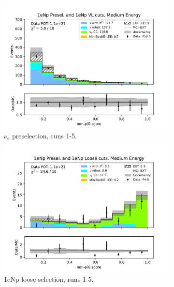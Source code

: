 \begin{figure}[H]
\begin{subfigure}{0.33\linewidth}
        \includegraphics[width=\linewidth]{technote/Sidebands/Figures/NearSideband/near_sideband_nonpi0_score_run1234b4c4d5_NP_NP_MEDIUM_ENERGY.pdf}
        \caption{$\nu_e$ preselection, runs 1-5.}
    \end{subfigure}%
    \begin{subfigure}{0.33\linewidth}
        \includegraphics[width=\linewidth]{technote/Sidebands/Figures/NearSideband/near_sideband_nonpi0_score_run1234b4c4d5_NP_NPL_MEDIUM_ENERGY.pdf}
        \caption{1eNp loose selection, runs 1-5.}
    \end{subfigure}%
    \begin{subfigure}{0.33\linewidth}

\end{subfigure}
\end{figure}

